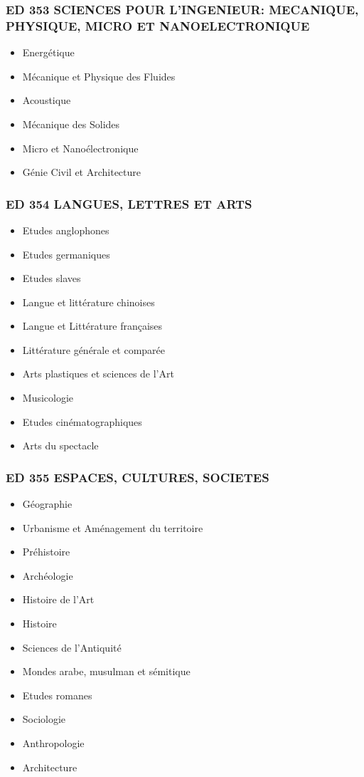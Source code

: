 \subsubsection*{ED 353 SCIENCES POUR L'INGENIEUR: MECANIQUE, PHYSIQUE, MICRO ET NANOELECTRONIQUE}\label{ed-353-sciences-pour-lingenieur-mecanique-physique-micro-et-nanoelectronique}

\begin{itemize}
\item Energétique
\item Mécanique et Physique des Fluides
\item Acoustique
\item Mécanique des Solides
\item Micro et Nanoélectronique
\item Génie Civil et Architecture
\end{itemize}

\subsubsection*{ED 354 LANGUES, LETTRES ET ARTS}\label{ed-354-langues-lettres-et-arts}

\begin{itemize}
\item Etudes anglophones
\item Etudes germaniques
\item Etudes slaves
\item Langue et littérature chinoises
\item Langue et Littérature françaises
\item Littérature générale et comparée
\item Arts plastiques et sciences de l'Art
\item Musicologie
\item Etudes cinématographiques
\item Arts du spectacle
\end{itemize}

\subsubsection*{ED 355 ESPACES, CULTURES, SOCIETES}\label{ed-355-espaces-cultures-societes}

\begin{itemize}
\item Géographie
\item Urbanisme et Aménagement du territoire
\item Préhistoire
\item Archéologie
\item Histoire de l'Art
\item Histoire
\item Sciences de l'Antiquité
\item Mondes arabe, musulman et sémitique
\item Etudes romanes
\item Sociologie
\item Anthropologie
\item Architecture
\end{itemize}

